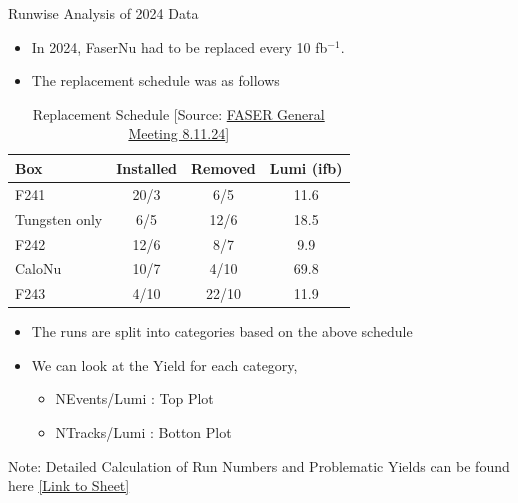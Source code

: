 \begin{frame}{Runwise Analysis of 2024 Data}
    \begin{itemize}
        \item In 2024, FaserNu had to be replaced every 10 fb$^{-1}$.
        \item The replacement schedule was as follows
    \end{itemize}
    \begin{table}[h!]
        \begin{tabular}{|l|c|c|c|}
            \hline
            \textbf{Box}  & \textbf{Installed} & \textbf{Removed} & \textbf{Lumi (ifb)} \\ \hline
            F241          & 20/3               & 6/5              & 11.6                \\ \hline
            Tungsten only & 6/5                & 12/6             & 18.5                \\ \hline
            F242          & 12/6               & 8/7              & 9.9                 \\ \hline
            CaloNu        & 10/7               & 4/10             & 69.8                \\ \hline
            F243          & 4/10               & 22/10            & 11.9                \\ \hline
        \end{tabular}
		\vspace{0.3cm}
        \caption{Replacement Schedule [Source: \href{https://indico.cern.ch/event/1350805/contributions/5686417/attachments/2963344/5212652/FASER-GeneralMtg-8.11.24.pdf}{FASER General Meeting 8.11.24}]}
    \end{table}
	\vspace{-0.5cm}
    \begin{itemize}
        \item The runs are split into categories based on the above schedule
        \item We can look at the Yield for each category, 
		\begin{itemize}
			\item NEvents/Lumi : Top Plot
			\item  NTracks/Lumi : Botton Plot
		\end{itemize}
    \end{itemize}
    \tiny{Note: Detailed Calculation of Run Numbers and Problematic Yields can be found here \href{https://docs.google.com/spreadsheets/d/1nnYFcmhVieSHI5XAVhPiW1K6CoGYGxv2YPchwL0sqH4/edit?usp=sharing}{[Link to Sheet]}}
\end{frame}

